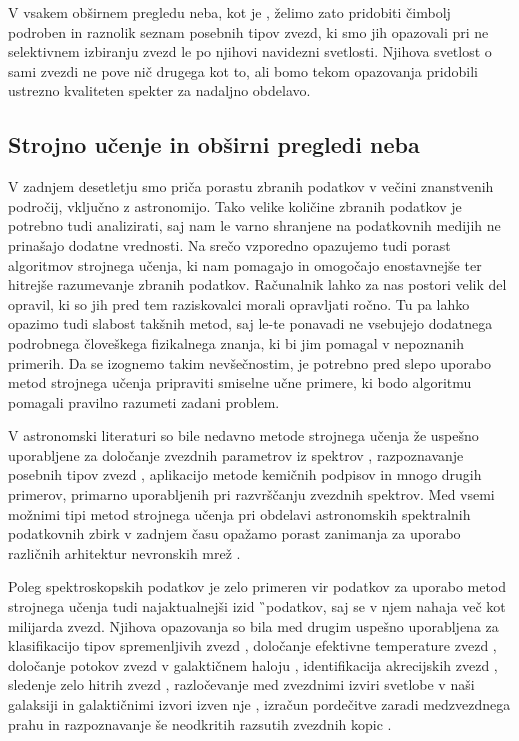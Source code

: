 V vsakem obširnem pregledu neba, kot je \Gh, želimo zato pridobiti čimbolj podroben in raznolik seznam posebnih tipov zvezd, ki smo jih opazovali pri ne selektivnem izbiranju zvezd le po njihovi navidezni svetlosti. Njihova svetlost o sami zvezdi ne pove nič drugega kot to, ali bomo tekom opazovanja pridobili ustrezno kvaliteten spekter za nadaljno obdelavo.

\subsection{Strojno učenje in obširni pregledi neba}
V zadnjem desetletju smo priča porastu zbranih podatkov v večini znanstvenih področij, vključno z astronomijo. Tako velike količine zbranih podatkov je potrebno tudi analizirati, saj nam le varno shranjene na podatkovnih medijih ne prinašajo dodatne vrednosti. Na srečo vzporedno opazujemo tudi porast algoritmov strojnega učenja, ki nam pomagajo in omogočajo enostavnejše ter hitrejše razumevanje zbranih podatkov. Računalnik lahko za nas postori velik del opravil, ki so jih pred tem raziskovalci morali opravljati ročno. Tu pa lahko opazimo tudi slabost takšnih metod, saj le-te ponavadi ne vsebujejo dodatnega podrobnega človeškega fizikalnega znanja, ki bi jim pomagal v nepoznanih primerih. Da se izognemo takim nevšečnostim, je potrebno pred slepo uporabo metod strojnega učenja pripraviti smiselne učne primere, ki bodo algoritmu pomagali pravilno razumeti zadani problem.

V astronomski literaturi so bile nedavno metode strojnega učenja že uspešno uporabljene za določanje zvezdnih parametrov iz spektrov \cite{2015ApJ...808...16N, buder2018, 2019ApJ...879...69T}, razpoznavanje posebnih tipov zvezd \cite{2017ApJS..228...24T}, aplikacijo metode kemičnih podpisov \cite{2015A&A...577A..47B, 2016ApJ...833..262H,2018MNRAS.473.4612K, 2018A&A...619A.125A, 2017MNRAS.467.1140J, 2018A&A...618A..65B} in mnogo drugih primerov, primarno uporabljenih pri razvrščanju zvezdnih spektrov. Med vsemi možnimi tipi metod strojnega učenja pri obdelavi astronomskih spektralnih podatkovnih zbirk v zadnjem času opažamo porast zanimanja za uporabo različnih arhitektur nevronskih mrež \cite{2015MNRAS.452..158Y, 2019MNRAS.483.3255L, 2020ApJ...891...23W, 2020arXiv200208390O}.

Poleg spektroskopskih podatkov je zelo primeren vir podatkov za uporabo metod strojnega učenja tudi najaktualnejši izid \G\ podatkov, saj se v njem nahaja več kot milijarda zvezd. Njihova opazovanja so bila med drugim uspešno uporabljena za klasifikacijo tipov spremenljivih zvezd \cite{2020MNRAS.493.2981B}, določanje efektivne temperature zvezd \cite{2019AJ....158...93B}, določanje potokov zvezd v galaktičnem haloju \cite{2017A&A...598A..58H, 2020MNRAS.492.1370B}, identifikacija akrecijskih zvezd \cite{2019arXiv190706652O, 2019arXiv190707681N}, sledenje zelo hitrih zvezd \cite{2017MNRAS.470.1388M}, razločevanje med zvezdnimi izviri svetlobe v naši galaksiji in galaktičnimi izvori izven nje \cite{2018RAA....18..118B, 2019MNRAS.490.5615B}, izračun pordečitve zaradi medzvezdnega prahu \cite{2020AJ....159...84B} in razpoznavanje še neodkritih razsutih zvezdnih kopic \cite{2020A&A...635A..45C}.

